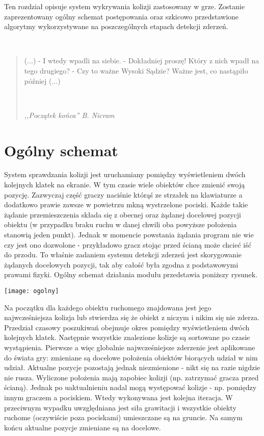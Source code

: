 \documentclass[licencjacka]{pracamgr}
\begin{document}
Ten rozdział opisuje system wykrywania kolizji zastosowany w grze. Zostanie zaprezentowany ogólny schemat postępowania oraz szkicowo przedstawione algorytmy wykorzystywane na poszczególnych etapach detekcji zderzeń.

\ \

\begin{quote}

(...)
\newline- I wtedy wpadli na siebie.
\newline- Dokładniej proszę! Który z nich wpadł na tego drugiego?
\newline- Czy to ważne Wysoki Sądzie? Ważne jest, co nastąpiło później (...)

  \ \

\raggedleft\slshape ,,Początek końca'' B. Nicram
\end{quote}

\section{Ogólny schemat}

System sprawdzania kolizji jest uruchamiany pomiędzy wyświetleniem dwóch kolejnych klatek na ekranie. W tym czasie wiele obiektów chce zmienić swoją pozycję. Zazwyczaj część graczy naciśnie którąś ze strzałek na klawiaturze a dodatkowo prawie zawsze w powietrzu mkną wystrzelone pociski. Każde takie żądanie przemieszczenia składa się z obecnej oraz żądanej docelowej pozycji obiektu (w przypadku braku ruchu w danej chwili oba powyższe położenia stanowią jeden punkt). Jednak w momencie powstania żądania program nie wie czy jest ono dozwolone - przykładowo gracz stojąc przed ścianą może chcieć iść do przodu. To właśnie zadaniem systemu detekcji zderzeń jest skorygowanie żądanych docelowych pozycji, tak aby całość była zgodna z podstawowymi prawami fizyki. Ogólny schemat działania modułu przedstawia poniższy rysunek.

\begin{center}
\texttt{[image: ogolny]}
\end{center}

Na początku dla każdego obiektu ruchomego znajdowana jest jego najwcześniejsza kolizja lub stwierdza się że obiekt z niczym i nikim się nie zderza. Przedział czasowy poszukiwań obejmuje okres pomiędzy wyświetleniem dwóch kolejnych klatek. Następnie wszystkie znalezione kolizje są sortowane po czasie wystąpienia. Pierwsze a więc globalnie najwcześniejsze zderzenie jest aplikowane do świata gry: zmieniane są docelowe położenia obiektów biorących udział w nim udział. Aktualne pozycje pozostają jednak niezmienione - nikt się na razie nigdzie nie rusza. Wyliczone położenia mają zapobiec kolizji (np. zatrzymać gracza przed ścianą). Jednak po uaktualnieniu nadal mogą występować kolizje - np. pomiędzy innym graczem a pociskiem. Wtedy wykonywana jest kolejna iteracja. W przeciwnym wypadku uwzględniana jest siła grawitacji i wszystkie obiekty ruchome (oczywiście poza pociskami) umieszczane są na gruncie. Na samym końcu aktualne pozycje zmieniane są na docelowe.
\end{document}
